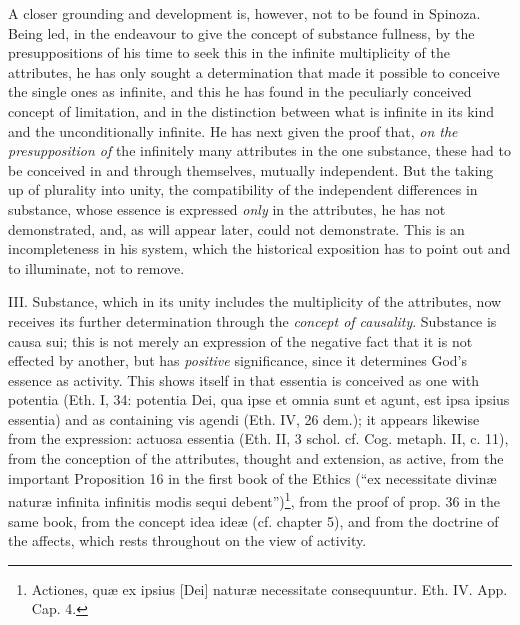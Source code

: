 \documentclass[12pt,a4paper,openany]{book}
\newcommand{\opage}[1]{\marginnote{\footnotesize\textit{[#1]}}}
\begin{document}
A closer grounding and development is, however, not to be found in Spinoza.
Being led, in the endeavour to give the concept of substance
fullness, by the presuppositions of his time to seek this in the
infinite multiplicity of the attributes, he has only sought a determination that made
it possible to conceive the single ones as infinite, and this he has
found in the peculiarly conceived concept of limitation, and in the
distinction between what is infinite in its kind and the unconditionally
infinite. He has next given the proof that, \emph{on the
presupposition of} the infinitely many attributes in the one substance,
these had to be conceived in and through themselves, mutually independent. But
the taking up of plurality into unity, the compatibility of the independent differences
in substance, whose essence is expressed \emph{only} in the attributes,
he has not demonstrated, and, as will appear later, could not
demonstrate. This is an incompleteness in his system, which the historical
exposition has to point out and to illuminate, not to remove.

III. Substance, which in its unity includes the multiplicity of the
attributes, now receives its further determination through the
\emph{concept of causality}. Substance is causa sui; this is
not merely an expression of the negative fact that it is not effected by
another, but has \emph{positive} significance, since it determines God's essence
as activity. This shows itself in that essentia is conceived as one with
potentia (Eth. I, 34: potentia Dei, qua ipse et omnia sunt et agunt,
est ipsa ipsius essentia) and as containing vis agendi (Eth. IV, 26
dem.); it appears likewise from the expression: actuosa essentia (Eth. II,
3 schol. cf. Cog. metaph. II, c. 11), from the conception of the attributes,
thought and extension, as active, from the important Proposition 16 in
the first book of the Ethics
\opage{54}\setcounter{footnote}{0}(``ex necessitate divinæ naturæ infinita infinitis modis sequi
debent'')\footnote{Actiones, quæ ex ipsius [Dei] naturæ necessitate
consequuntur. Eth. IV. App. Cap. 4.}, from the proof of prop. 36 in the same
book, from the concept idea ideæ (cf. chapter 5), and from the doctrine of the affects,
which rests throughout on the view of activity.
\end{document}
